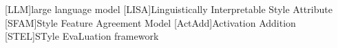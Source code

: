 \begin{acronym}[ActAdd] %
	[LLM]{large language model}
	[LISA]{Linguistically Interpretable Style Attribute}
	[SFAM]{Style Feature Agreement Model}
	[ActAdd]{Activation Addition}
	[STEL]{STyle EvaLuation framework}
\end{acronym}